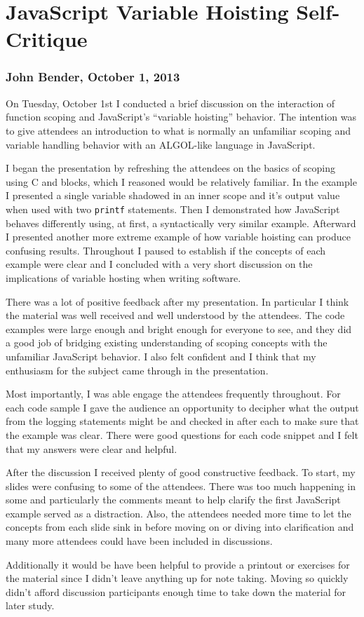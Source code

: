 \documentclass[pdftex,12pt,a4paper]{report}
\begin{document}
\section{JavaScript Variable Hoisting Self-Critique}
\subsubsection{John Bender, October 1, 2013}

On Tuesday, October 1st I conducted a brief discussion on the interaction of function scoping and JavaScript's ``variable hoisting'' behavior. The intention was to give attendees an introduction to what is normally an unfamiliar scoping and variable handling behavior with an ALGOL-like language in JavaScript.

I began the presentation by refreshing the attendees on the basics of scoping using C and blocks, which I reasoned would be relatively familiar. In the example I presented a single variable shadowed in an inner scope and it's output value when used with two \verb|printf| statements. Then I demonstrated how JavaScript behaves differently using, at first, a syntactically very similar example. Afterward I presented another more extreme example of how variable hoisting can produce confusing results. Throughout I paused to establish if the concepts of each example were clear and I concluded with a very short discussion on the implications of variable hosting when writing software.

There was a lot of positive feedback after my presentation. In particular I think the material was well received and well understood by the attendees. The code examples were large enough and bright enough for everyone to see, and they did a good job of bridging existing understanding of scoping concepts with the unfamiliar JavaScript behavior. I also felt confident and I think that my enthusiasm for the subject came through in the presentation.

Most importantly, I was able engage the attendees frequently throughout. For each code sample I gave the audience an opportunity to decipher what the output from the logging statements might be and checked in after each to make sure that the example was clear. There were good questions for each code snippet and I felt that my answers were clear and helpful.

After the discussion I received plenty of good constructive feedback. To start, my slides were confusing to some of the attendees. There was too much happening in some and particularly the comments meant to help clarify the first JavaScript example served as a distraction. Also, the attendees needed more time to let the concepts from each slide sink in before moving on or diving into clarification and many more attendees could have been included in discussions.

Additionally it would be have been helpful to provide a printout or exercises for the material since I didn't leave anything up for note taking. Moving so quickly didn't afford discussion participants enough time to take down the material for later study.
\end{document}
